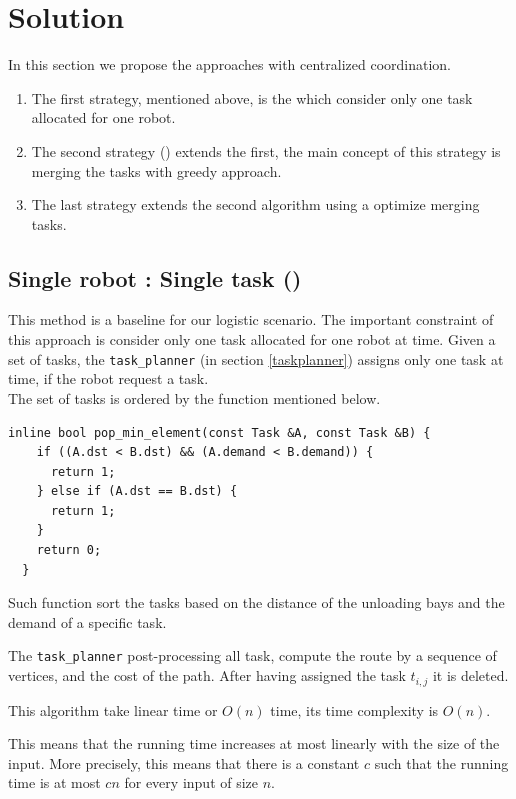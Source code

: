 \section{Solution}

In this section we propose the approaches with centralized coordination.
\begin{enumerate}
\item The first strategy, mentioned above, is the \srst which consider only 
one task allocated for one robot.

\item The second strategy (\gsp) extends the first, the main concept of this strategy 
is merging the tasks with greedy approach. 

\item The last strategy \sps extends the second algorithm using a optimize merging tasks. 
\end{enumerate}

\subsection{Single robot : Single task (\srst)}

This method is a baseline for our logistic scenario.
The important constraint of this approach is consider only one task allocated for 
one robot at time.
Given a set of tasks, the \texttt{task\_planner} (in section \ref{taskplanner}) assigns only one task at time,
if the robot request a task.
\\
The set of tasks is ordered by the function mentioned below.
\begin{lstlisting}
inline bool pop_min_element(const Task &A, const Task &B) {
    if ((A.dst < B.dst) && (A.demand < B.demand)) {
      return 1;
    } else if (A.dst == B.dst) {
      return 1;
    }
    return 0;
  }
\end{lstlisting}
Such function sort the tasks based on the distance of the unloading bays and the demand of a specific task.

The \texttt{task\_planner} post-processing all task, compute the route by a sequence 
of vertices, and the cost of the path. After having assigned the task $t_{i,j}$ 
it is deleted.

This algorithm take linear time or $O(n)$ time, its time complexity is $O(n)$.

\newpage
This means that the running time increases at most linearly with the size of the input.
More precisely, this means that there is a constant $c$ such that the running time is 
at most $cn$ for every input of size $n$.

